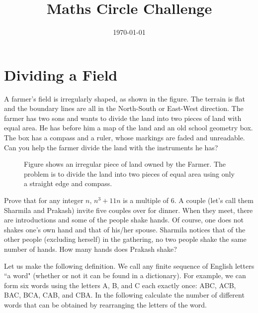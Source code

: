 \documentclass[12pt]{exam}
\date{\today}
\begin{document}
\title{Maths Circle Challenge}
\maketitle
\thispagestyle{empty}
\section*{Dividing a Field}

\begin{questions}
\question A farmer's field is irregularly shaped, as shown in the figure. The terrain is flat and the boundary lines are all in the North-South or East-West direction. The farmer has two sons and wants to divide the land into two pieces of land with equal area. He has before him a map of the land and an old school geometry box. The box has a compass and a ruler, whose markings are faded and unreadable. Can you help the farmer divide the land with the instruments he has?
\begin{figure}[h]
    \centering
    \caption{Figure shows an irregular piece of land owned by the Farmer. The problem is to divide the land into two pieces of equal area using only a straight edge and compass.}
\end{figure}

\question Prove that for any integer $n$, $n^3+11n$ is a multiple of 6.
\question A couple (let's call them Sharmila and Prakash) invite five couples over for dinner. When they meet, there are introductions and some of the people shake hands. Of course, one does not shakes one's own hand and that of his/her spouse. Sharmila notices that of the other people (excluding herself) in the gathering, no two people shake the same number of hands. How many hands does Prakash shake?

\question Let us make the following definition. We call any finite sequence of English letters ``a word" (whether or not it can be found in a dictionary). For example, we can form six words using the letters A, B, and C each exactly once: ABC, ACB, BAC, BCA, CAB, and CBA. In the following calculate the number of different words that can be obtained by rearranging the letters of the word.
\begin{parts}

\end{parts}
\end{questions}
\end{document}
